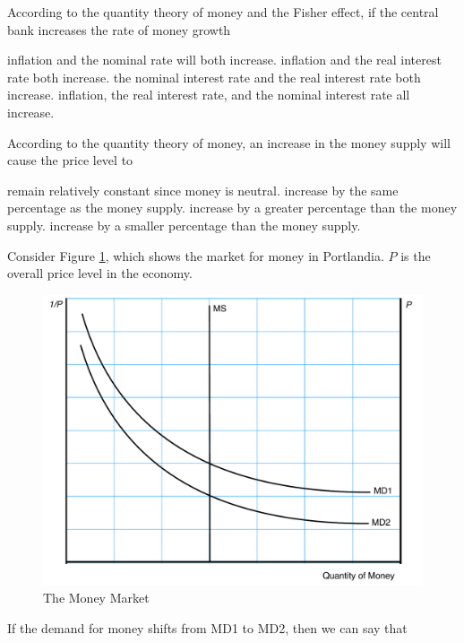 \documentclass[addpoints,11pt]{exam}
\theoremstyle{definition}
\begin{document}
\begin{questions}
\question According to the quantity theory of money and the Fisher effect, if the central bank increases the rate of money growth

\begin{choices}
	\CorrectChoice inflation and the nominal rate will both increase. 
	\choice inflation and the real interest rate both increase.
	\choice the nominal interest rate and the real interest rate both increase.
	\choice inflation, the real interest rate, and the nominal interest rate all increase.
\end{choices}


\question According to the quantity theory of money, an increase in the money supply will cause the price level to 

\begin{choices}
	\choice remain relatively constant since money is neutral.
	\CorrectChoice increase by the same percentage as the money supply.
	\choice increase by a greater percentage than the money supply.
	\choice increase by a smaller percentage than the money supply.
\end{choices}


\question Consider Figure \ref{MC8}, which shows the market for money in Portlandia. $P$ is the overall price level in the economy.

\begin{figure}[H]
	\centering
	\includegraphics[scale=.40]{Final_MC8.pdf}
	\caption{The Money Market}
	\label{MC8}
\end{figure}

If the demand for money shifts from MD1 to MD2, then we can say that 


\end{questions}
\end{document}
